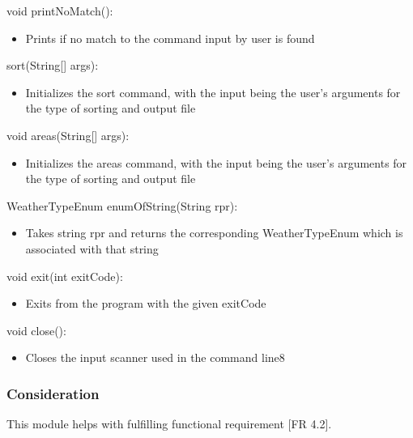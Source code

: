 \documentclass[12pt]{article}
\begin{document}
                \noindent void printNoMatch():
			    \begin{itemize}
			        \item Prints if no match to the command input by user is found
			    \end{itemize}
                
                \noindent sort(String[] args):
			    \begin{itemize}
			        \item Initializes the sort command, with the input being the user's arguments for the type of sorting and output file
			    \end{itemize}
                
                \noindent void areas(String[] args):
			    \begin{itemize}
			        \item Initializes the areas command, with the input being the user's arguments for the type of sorting and output file
			    \end{itemize}
                
                \noindent WeatherTypeEnum enumOfString(String rpr):
			    \begin{itemize}
			        \item Takes string rpr and returns the corresponding WeatherTypeEnum which is associated with that string
			    \end{itemize}
                
                \noindent void exit(int exitCode):
			    \begin{itemize}
			        \item Exits from the program with the given exitCode
			    \end{itemize}
                
                \noindent void close():
			    \begin{itemize}
			        \item Closes the input scanner used in the command line8
			    \end{itemize}
		    
                \subsubsection*{Consideration}
                
                This module helps with fulfilling functional requirement [FR 4.2].
                
\end{document}

